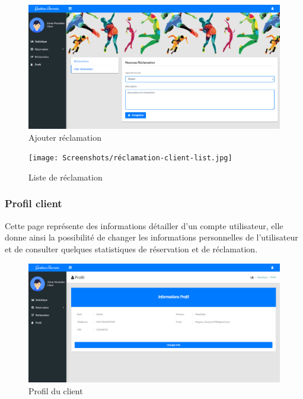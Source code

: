 \documentclass[a4paper]{report}
\begin{document}
\begin{spacing}{2}
\begin{figure}[!ht]
\begin{center}
\includegraphics[width=18cm]{Screenshots/Reclamation.png}
\end{center}
\caption[Ajouter réclamation]{Ajouter réclamation}
\end{figure}


\begin{figure}[!ht]
\begin{center}
\texttt{[image: Screenshots/réclamation-client-list.jpg]}
\end{center}
\caption[Liste de réclamation]{Liste de réclamation}
\end{figure}
\cleardoublepage

\subsubsection{Profil client}
Cette page représente des informations détailler d'un compte utilisateur, elle donne ainsi la possibilité de changer les informations personnelles de l'utilisateur et de consulter quelques statistiques de réservation et de réclamation.

\begin{figure}[!ht]
\begin{center}
\includegraphics[width=18cm]{Screenshots/Profil-Client.png}
\end{center}
\caption[Profil du client]{Profil du client}
\end{figure}


\end{spacing}
\end{document}
